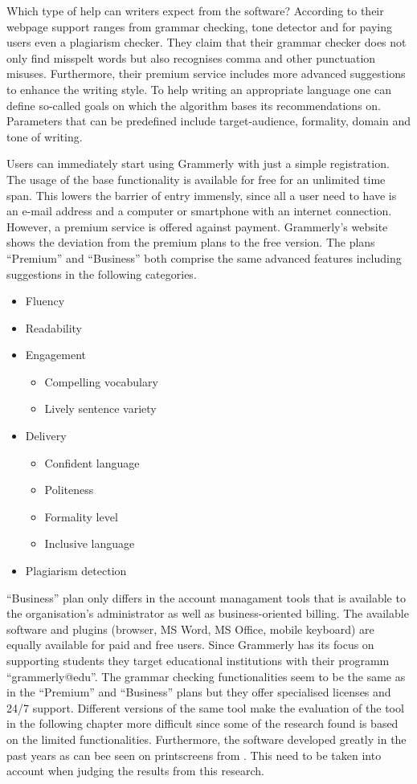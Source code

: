 \documentclass[runningheads]{llncs}
\begin{document}
Which type of help can writers expect from the software? According to their webpage \parencite{noauthor_write_nodate} support ranges from grammar checking, tone detector and for paying users even a plagiarism checker. They claim that their grammar checker does not only find misspelt words but also recognises comma and other punctuation misuses. Furthermore, their premium service includes more advanced suggestions to enhance the writing style. To help writing an appropriate language one can define so-called goals on which the algorithm bases its recommendations on. Parameters that can be predefined include target-audience, formality, domain and tone of writing.   

Users can immediately start using Grammerly with just a simple registration. The usage of the base functionality is available for free for an unlimited time span. This lowers the barrier of entry immensly, since all a user need to have is an e-mail address and a computer or smartphone with an internet connection. However, a premium service is offered against payment. Grammerly's website \citep{noauthor_write_nodate} shows the deviation from the premium plans to the free version. The plans ``Premium'' and ``Business'' both comprise the same advanced features including suggestions in the following categories.
\begin{itemize}
 \item Fluency
 \item Readability
 \item Engagement
 \begin{itemize}
  \item Compelling vocabulary
  \item Lively sentence variety
 \end{itemize}
 \item Delivery
 \begin{itemize}
  \item Confident language
  \item Politeness
  \item Formality level
  \item Inclusive language
 \end{itemize}
 \item Plagiarism detection
\end{itemize}
``Business'' plan only differs in the account managament tools that is available to the organisation's administrator as well as business-oriented billing. The available software and plugins (browser, MS Word, MS Office, mobile keyboard) are equally available for paid and free users. Since Grammerly has its focus on supporting students they target educational institutions with their programm ``grammerly@edu''. The grammar checking functionalities seem to be the same as in the ``Premium'' and ``Business'' plans but they offer specialised licenses and 24/7 support. Different versions of the same tool make the evaluation of the tool in the following chapter more difficult since some of the research found is based on the limited functionalities. Furthermore, the software developed greatly in the past years as can bee seen on printscreens from \textcite{dembsey_closing_2017}. This need to be taken into account when judging the results from this research.
\end{document}

